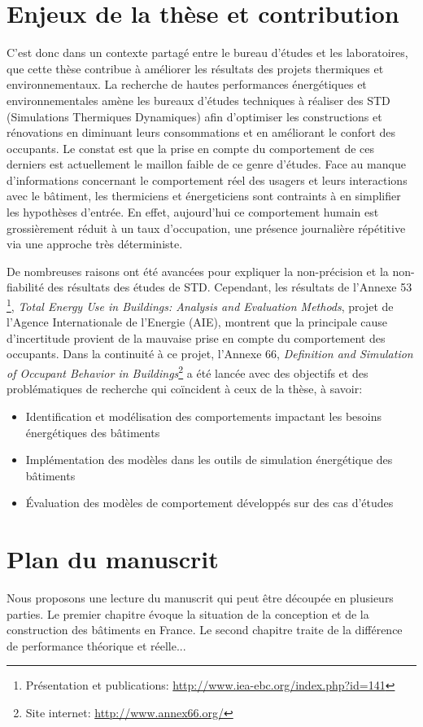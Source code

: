 \section*{Enjeux de la thèse et contribution}

C'est donc dans un contexte partagé entre le bureau d'études et les laboratoires, que cette thèse contribue à améliorer les résultats des projets thermiques et environnementaux. La recherche de hautes performances énergétiques et environnementales amène les bureaux d'études techniques à réaliser des STD (Simulations Thermiques Dynamiques) afin d'optimiser les constructions et rénovations en diminuant leurs consommations et en améliorant le confort des occupants. Le constat est que la prise en compte du comportement de ces derniers est actuellement le maillon faible de ce genre d'études. Face au manque d'informations concernant le comportement réel des usagers et leurs interactions avec le bâtiment, les thermiciens et énergeticiens sont contraints à en simplifier les hypothèses d'entrée. En effet, aujourd'hui ce comportement humain est grossièrement réduit à un taux d'occupation, une présence journalière répétitive via une approche très déterministe.

De nombreuses raisons ont été avancées pour expliquer la non-précision et la non-fiabilité des résultats des études de STD. Cependant, les résultats de l'Annexe 53 \cite{Annex-53-1}\footnote{Présentation et publications: \url{http://www.iea-ebc.org/index.php?id=141}}, \textit{Total Energy Use in Buildings: Analysis and Evaluation Methods}, projet de l'Agence Internationale de l'Energie (AIE), montrent que la principale cause d'incertitude provient de la mauvaise prise en compte du comportement des occupants. Dans la continuité à ce projet, l'Annexe 66, \textit{Definition and Simulation of Occupant Behavior in Buildings}\footnote{Site internet: \url{http://www.annex66.org/}} a été lancée avec des objectifs et des problématiques de recherche qui coïncident à ceux de la thèse, à savoir:
\begin{itemize}
\item Identification et modélisation des comportements impactant les besoins énergétiques des bâtiments
\item Implémentation des modèles dans les outils de simulation énergétique des bâtiments
\item Évaluation des modèles de comportement développés sur des cas d'études
\end{itemize}

\section*{Plan du manuscrit}

Nous proposons une lecture du manuscrit qui peut être découpée en plusieurs parties. Le premier chapitre évoque la situation de la conception et de la construction des bâtiments en France. Le second chapitre traite de la différence de performance théorique et réelle...